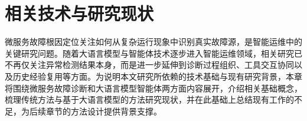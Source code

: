 
\chapter{相关技术与研究现状}

微服务故障根因定位关注如何从复杂运行现象中识别真实故障源，是智能运维中的关键研究问题。随着大语言模型与智能体技术逐步进入智能运维领域，相关研究已不再仅关注异常检测结果本身，而是进一步延伸到诊断过程组织、工具交互协同以及历史经验复用等方面。为说明本文研究所依赖的技术基础与现有研究背景，本章将围绕微服务故障诊断和大语言模型智能体两方面内容展开，介绍相关基础概念，梳理传统方法与基于大语言模型的方法研究现状，并在此基础上总结现有工作的不足，为后续章节的方法设计提供背景支撑。











